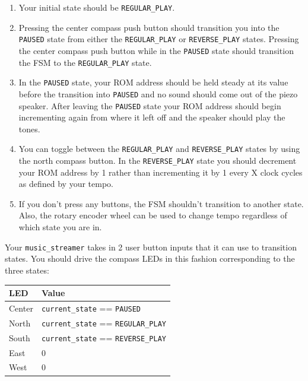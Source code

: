 \documentclass[11pt]{article}
\begin{document}
\begin{enumerate}
	\item Your initial state should be \verb|REGULAR_PLAY|. 
	
	\item Pressing the center compass push button should transition you into the \verb|PAUSED| state from either the \verb|REGULAR_PLAY| or \verb|REVERSE_PLAY| states. Pressing the center compass push button while in the \verb|PAUSED| state should transition the FSM to the \verb|REGULAR_PLAY| state.
	
	\item In the \verb|PAUSED| state, your ROM address should be held steady at its value before the transition into \verb|PAUSED| and no sound should come out of the piezo speaker. After leaving the \verb|PAUSED| state your ROM address should begin incrementing again from where it left off and the speaker should play the tones.
	
	\item You can toggle between the \verb|REGULAR_PLAY| and \verb|REVERSE_PLAY| states by using the north compass button. In the \verb|REVERSE_PLAY| state you should decrement your ROM address by 1 rather than incrementing it by 1 every X clock cycles as defined by your tempo.
	
	\item If you don't press any buttons, the FSM shouldn't transition to another state. Also, the rotary encoder wheel can be used to change tempo regardless of which state you are in.
\end{enumerate}

Your \verb|music_streamer| takes in 2 user button inputs that it can use to transition states. You should drive the compass LEDs in this fashion corresponding to the three states:

\renewcommand{\arraystretch}{1.5}
\begin{center}
\begin{tabular}{| l | l |}
	\hline
	\textbf{LED} & \textbf{Value} \\ \hline
	Center & \verb|current_state| == \verb|PAUSED| \\ \hline
	North & \verb|current_state| == \verb|REGULAR_PLAY| \\ \hline
	South & \verb|current_state| == \verb|REVERSE_PLAY| \\ \hline
	East & 0 \\ \hline
	West & 0 \\ \hline
\end{tabular}
\end{center}
\end{document}
